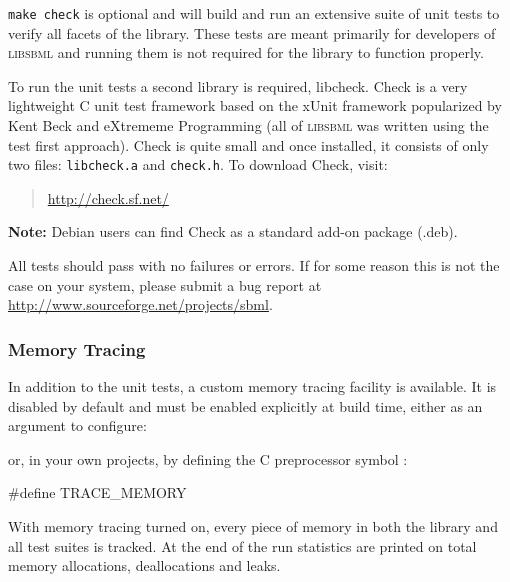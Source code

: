 \documentclass{cekmanual}
\begin{document}
\begin{example}
\end{example}


\texttt{make check} is optional and will build and run an extensive
suite of unit tests to verify all facets of the library.  These tests
are meant primarily for developers of \textsc{libsbml} and running
them is not required for the library to function properly.

To run the unit tests a second library is required, libcheck.  Check
is a very lightweight C unit test framework based on the xUnit
framework popularized by Kent Beck and eXtrememe Programming (all of
\textsc{libsbml} was written using the test first approach).  Check is
quite small and once installed, it consists of only two files:
\texttt{libcheck.a} and \texttt{check.h}.  To download Check, visit:

\begin{quote}
\url{http://check.sf.net/}
\end{quote}

\textbf{Note:} Debian users can find Check as a standard add-on
package (.deb).

All tests should pass with no failures or errors.  If for some reason
this is not the case on your system, please submit a bug report at
\url{http://www.sourceforge.net/projects/sbml}.


\subsubsection{Memory Tracing}

In addition to the unit tests, a custom memory tracing facility is
available.  It is disabled by default and must be enabled explicitly
at build time, either as an argument to configure:

\begin{example}
\end{example}

or, in your own projects, by defining the C preprocessor symbol
:

\begin{example}
  #define TRACE_MEMORY
\end{example}

With memory tracing turned on, every piece of memory in both the
library and all test suites is tracked.  At the end of the run
statistics are printed on total memory allocations, deallocations and
leaks.
\end{document}
